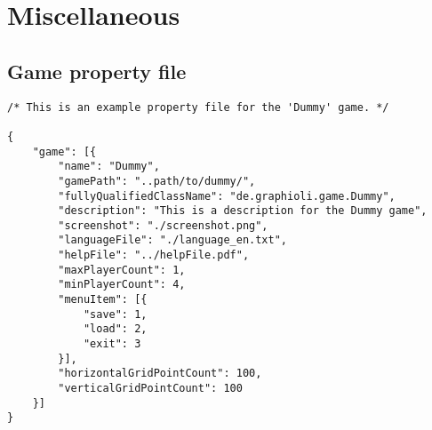 \section{Miscellaneous}
\subsection{Game property file}

\begin{lstlisting}[caption=An example of a property file]
/* This is an example property file for the 'Dummy' game. */

{
    "game": [{
        "name": "Dummy",
        "gamePath": "..path/to/dummy/",
        "fullyQualifiedClassName": "de.graphioli.game.Dummy",
        "description": "This is a description for the Dummy game",
        "screenshot": "./screenshot.png",
        "languageFile": "./language_en.txt",
        "helpFile": "../helpFile.pdf",
        "maxPlayerCount": 1,
        "minPlayerCount": 4,
        "menuItem": [{
            "save": 1,
            "load": 2,
            "exit": 3
        }],
        "horizontalGridPointCount": 100,
        "verticalGridPointCount": 100
    }]
}
\end{lstlisting}
